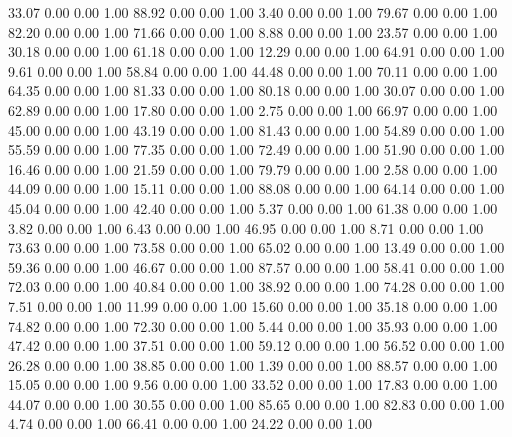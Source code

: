    33.07   0.00   0.00   1.00
   88.92   0.00   0.00   1.00
    3.40   0.00   0.00   1.00
   79.67   0.00   0.00   1.00
   82.20   0.00   0.00   1.00
   71.66   0.00   0.00   1.00
    8.88   0.00   0.00   1.00
   23.57   0.00   0.00   1.00
   30.18   0.00   0.00   1.00
   61.18   0.00   0.00   1.00
   12.29   0.00   0.00   1.00
   64.91   0.00   0.00   1.00
    9.61   0.00   0.00   1.00
   58.84   0.00   0.00   1.00
   44.48   0.00   0.00   1.00
   70.11   0.00   0.00   1.00
   64.35   0.00   0.00   1.00
   81.33   0.00   0.00   1.00
   80.18   0.00   0.00   1.00
   30.07   0.00   0.00   1.00
   62.89   0.00   0.00   1.00
   17.80   0.00   0.00   1.00
    2.75   0.00   0.00   1.00
   66.97   0.00   0.00   1.00
   45.00   0.00   0.00   1.00
   43.19   0.00   0.00   1.00
   81.43   0.00   0.00   1.00
   54.89   0.00   0.00   1.00
   55.59   0.00   0.00   1.00
   77.35   0.00   0.00   1.00
   72.49   0.00   0.00   1.00
   51.90   0.00   0.00   1.00
   16.46   0.00   0.00   1.00
   21.59   0.00   0.00   1.00
   79.79   0.00   0.00   1.00
    2.58   0.00   0.00   1.00
   44.09   0.00   0.00   1.00
   15.11   0.00   0.00   1.00
   88.08   0.00   0.00   1.00
   64.14   0.00   0.00   1.00
   45.04   0.00   0.00   1.00
   42.40   0.00   0.00   1.00
    5.37   0.00   0.00   1.00
   61.38   0.00   0.00   1.00
    3.82   0.00   0.00   1.00
    6.43   0.00   0.00   1.00
   46.95   0.00   0.00   1.00
    8.71   0.00   0.00   1.00
   73.63   0.00   0.00   1.00
   73.58   0.00   0.00   1.00
   65.02   0.00   0.00   1.00
   13.49   0.00   0.00   1.00
   59.36   0.00   0.00   1.00
   46.67   0.00   0.00   1.00
   87.57   0.00   0.00   1.00
   58.41   0.00   0.00   1.00
   72.03   0.00   0.00   1.00
   40.84   0.00   0.00   1.00
   38.92   0.00   0.00   1.00
   74.28   0.00   0.00   1.00
    7.51   0.00   0.00   1.00
   11.99   0.00   0.00   1.00
   15.60   0.00   0.00   1.00
   35.18   0.00   0.00   1.00
   74.82   0.00   0.00   1.00
   72.30   0.00   0.00   1.00
    5.44   0.00   0.00   1.00
   35.93   0.00   0.00   1.00
   47.42   0.00   0.00   1.00
   37.51   0.00   0.00   1.00
   59.12   0.00   0.00   1.00
   56.52   0.00   0.00   1.00
   26.28   0.00   0.00   1.00
   38.85   0.00   0.00   1.00
    1.39   0.00   0.00   1.00
   88.57   0.00   0.00   1.00
   15.05   0.00   0.00   1.00
    9.56   0.00   0.00   1.00
   33.52   0.00   0.00   1.00
   17.83   0.00   0.00   1.00
   44.07   0.00   0.00   1.00
   30.55   0.00   0.00   1.00
   85.65   0.00   0.00   1.00
   82.83   0.00   0.00   1.00
    4.74   0.00   0.00   1.00
   66.41   0.00   0.00   1.00
   24.22   0.00   0.00   1.00
